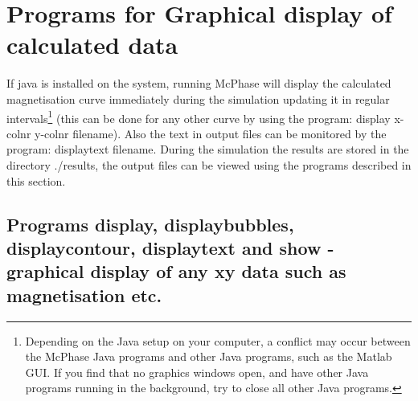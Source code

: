 
\section{Programs for Graphical display of calculated data}
\label{graphics}

If java is installed on the system, running McPhase will
 display the calculated magnetisation
curve immediately during the simulation updating 
it in regular intervals\footnote{Depending on the Java setup on your computer, a conflict may occur between the McPhase 
Java programs and other Java programs, such as the Matlab GUI. If you find that no graphics
windows open, and have other Java programs running in the background, try to close all other Java programs.}
(this can be done for any other
curve  by using the
program: {\prg display x-colnr y-colnr filename}). 
Also the text in output files can be monitored by the program:
{\prg displaytext filename}.
During the simulation
the results are stored in the directory {\prg ./results}, the output files can be viewed 
using the programs described in this section. 

\subsection{Programs {\prg display}, {\prg displaybubbles}, {\prg %
displaycontour}, {\prg displaytext} and {\prg show} - graphical %
display of any xy data such as magnetisation etc.}
\label{display}

